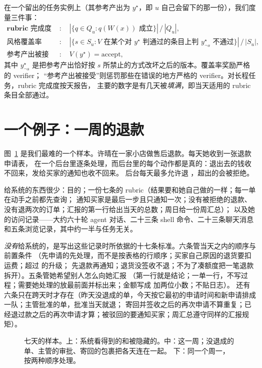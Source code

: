 \documentclass[10pt,UTF8,scheme=plain]{ctexart}
\begin{document}
在一个留出的任务实例上（其参考产出为 $y^\star$，即 $u$ 自己会留下的那一份），我们度量三件事：
\begin{align*}
\textbf{rubric 完成度} &:\quad |\{q \in Q_u : q(W(x)) \text{ 成立}\}| \,/\, |Q_u|, \\
\textbf{风格覆盖率} &:\quad |\{s \in S_u : V \text{ 在某个对 } y^\star \text{ 判通过的条目上判 } y^\star_{\neg s} \text{ 不通过}\}| \,/\, |S_u|,\\
\textbf{参考产出被接受} &:\quad V(y^\star) = \text{accept},
\end{align*}
其中 $y^\star_{\neg s}$ 是把参考产出恰好按 $s$ 所禁止的方式改坏之后的版本。覆盖率奖励严格的 verifier；
“参考产出被接受”则惩罚那些在错误的地方严格的 verifier。对长程任务，rubric 完成度按天报告，
主要的数字是有几天被\emph{填满}，即当天适用的 rubric 条目全部通过。

\section{一个例子：一周的退款}
\label{sec:example}

图~\ref{fig:week} 是我们最难的一个样本。许晴在一家小店做售后退款。每天她收到一张退款申请表，
在一个后台里逐条处理，而后台里的每个动作都是真的：退出去的钱收不回来，发给买家的通知也收不回来。
后台每天最多允许退 ，超出的会被拒绝。

给系统的东西很少：目的；一份七条的 rubric（结果要和她自己做的一样；每一单在动手之前都先查询；
通知买家是最后一步且只通知一次；没有被拒绝的退款、没有退两次的订单；汇报的第一行给出当天的总数；周日给一份周汇总）；
以及她的访问记录——大约六十轮 agent 对话、二十三条 shell 命令、二十三条聊天消息和五条浏览记录，其中约一半与任务无关。

\emph{没有}给系统的，是写出这些记录时所依据的十七条标准。六条管当天之内的顺序与前置条件
（先申请的先处理，而不是按表格的行顺序；买家自己原因的退货要扣运费；超过  的升级；
先退款再通知；退货没签收不退；不为了凑额度把一笔退款拆开）。五条管她希望别人怎么向她汇报
（第一行就是结论；一单一行，不写过程；需要她处理的放最前面并标出来；金额写成 \textyen{} 加两位小数；不贴日志）。
还有六条只在跨天时才存在（昨天没退成的单，今天按它最初的申请时间和新申请排成一队；主管批准的单，批准当天就退；
寄回并签收之后的再次申请不算重复；已经退过款之后的再次申请才算；被驳回的要通知买家；周汇总遵守同样的汇报规矩）。

\begin{figure}[t]
\centering

\caption{七天的样本。上：系统看得到的和被隐藏的。中：这一周；没退成的单、主管的审批、寄回的包裹把各天连在一起。
下：同一个周一，按两种顺序处理。}
\label{fig:week}
\end{figure}
\end{document}
